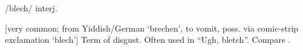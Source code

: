  /blech/ interj.

[very common; from Yiddish/German `brechen', to vomit, poss. via comic-strip
exclamation `blech'] Term of disgust. Often used in ``Ugh, bletch''. Compare
.

